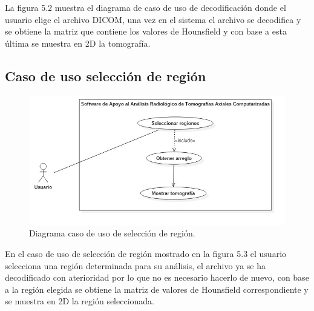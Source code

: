 \documentclass[12pt]{report}
\begin{document}
La figura 5.2 muestra el diagrama de caso de uso de decodificación donde el usuario elige el archivo DICOM, una vez en el sistema el archivo se decodifica y se obtiene la matriz que contiene los valores de Hounsfield y con base a esta última se muestra en 2D la tomografía.

\subsection{Caso de uso selección de región}
\begin{figure}[H]
\centering
\includegraphics[width = 10 cm, height =  10 cm]{RegionCasos}
\caption{Diagrama caso de uso de selección de región.}
\end{figure}

En el caso de uso de selección de región mostrado en la figura 5.3 el usuario selecciona una región determinada para su análisis, el archivo ya se ha decodificado con aterioridad por lo que no es necesario hacerlo de nuevo, con base a la región elegida se obtiene la matriz de valores de Hounsfield correspondiente y se muestra en 2D la región seleccionada.
\end{document}

